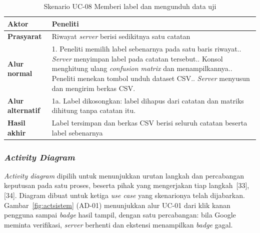 \documentclass[12pt,a4paper,twoside]{report}
\begin{document}
\begin{table}[H]
  \centering
  \caption{Skenario UC-08 Memberi label dan mengunduh data uji}
  \label{tab:skn8}
  \begin{spacing}{1.0}
  \normalsize
  \setlength{\extrarowheight}{2pt}
  \begin{tabular}{|R{3.0cm}|R{9.6cm}|}
    \hline
    \textbf{Aktor} & Peneliti \\ \hline
    \textbf{Prasyarat} & Riwayat \textit{server} berisi sedikitnya satu catatan \\ \hline
    \textbf{Alur normal} & 1. Peneliti memilih label sebenarnya pada satu baris riwayat.. \textit{Server} menyimpan label pada catatan tersebut.. Konsol menghitung ulang \textit{confusion matrix} dan menampilkannya.. Peneliti menekan tombol unduh dataset CSV.. \textit{Server} menyusun dan mengirim berkas CSV. \\ \hline
    \textbf{Alur alternatif} & 1a. Label dikosongkan: label dihapus dari catatan dan matriks dihitung tanpa catatan itu. \\ \hline
    \textbf{Hasil akhir} & Label tersimpan dan berkas CSV berisi seluruh catatan beserta label sebenarnya \\ \hline
  \end{tabular}
  \end{spacing}
\end{table}

\subsubsection{\textit{Activity Diagram}}\label{sub:activity}

\textit{Activity diagram} dipilih untuk menunjukkan urutan langkah dan percabangan keputusan pada satu proses, beserta pihak yang mengerjakan tiap langkah~[33], [34]. Diagram dibuat untuk ketiga \textit{use case} yang skenarionya telah dijabarkan. Gambar~\ref{fig:actsistem} (AD-01) menunjukkan alur UC-01 dari klik kanan pengguna sampai \textit{badge} hasil tampil, dengan satu percabangan: bila Google meminta verifikasi, \textit{server} berhenti dan ekstensi menampilkan \textit{badge} gagal.
\end{document}
